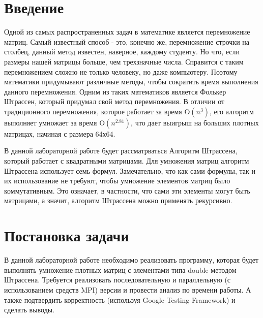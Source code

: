 \documentclass{report}
\begin{document}
\setcounter{page}{2}

\tableofcontents
\newpage

\section*{Введение}
Одной из самых распространенных задач в математике является перемножение матриц. Самый известный способ - это, конечно же, перемножение строчки на столбец, данный метод известен, наверное, каждому студенту. Но что, если размеры нашей матрицы больше, чем трехзначные числа. Справится с таким перемножением сложно не только человеку, но даже компьютеру. Поэтому математики придумывают различные методы, чтобы сократить время выполнения данного перемножения. Одним из таких математиков является Фолькер Штрассен, который придумал свой метод перемножения. В отличии от традиционного перемножения, которое работает за время O$(n^3)$, его алгоритм выполняет умножает за время O$(n^{2.81})$, что дает выигрыш на больших плотных матрицах, начиная с размера 64х64.
 
\par В данной лабораторной работе будет рассматрваться Алгоритм Штрассена, который работает с квадратными матрицами. Для умножения матриц алгоритм Штрассена использует семь формул. Замечательно, что как сами формулы, так и их использование не требуют, чтобы умножение элементов матриц было коммутативным. Это означает, в частности, что сами эти элементы могут быть матрицами, а значит, алгоритм Штрассена можно применять рекурсивно.
\newpage

\section*{Постановка задачи}
В данной лабораторной работе необходимо реализовать программу, которая будет выполнять умножение плотных матриц с элементами типа double методом Штрассена. Требуется реализовать последовательную и параллельную (с использованием средств MPI) версии  и провести анализ по времени работы. А также подтвердить корректность (используя Google Testing Framework) и сделать выводы.
\newpage

\end{document}
